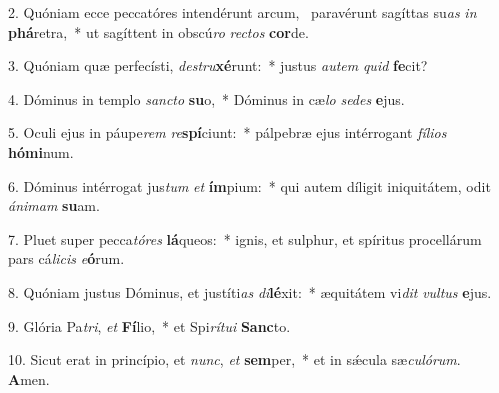 2. Quóniam ecce peccatóres intendérunt arcum, \dag\  paravérunt sagíttas su\textit{as} \textit{in} \textbf{phá}retra,~*  ut sagíttent in obscú\textit{ro} \textit{rec}\textit{tos} \textbf{cor}de.\

3. Quóniam quæ perfecísti, \textit{de}\textit{stru}\textbf{xé}runt:~*  justus \textit{au}\textit{tem} \textit{quid} \textbf{fe}cit?\

4. Dóminus in templo \textit{sanc}\textit{to} \textbf{su}o,~*  Dóminus in cæ\textit{lo} \textit{se}\textit{des} \textbf{e}jus.\

5. Oculi ejus in páupe\textit{rem} \textit{re}\textbf{spí}ciunt:~*  pálpebræ ejus intérrogant \textit{fí}\textit{li}\textit{os} \textbf{hó}\textbf{mi}num.\

6. Dóminus intérrogat jus\textit{tum} \textit{et} \textbf{ím}pium:~*  qui autem díligit iniquitátem, odit \textit{á}\textit{ni}\textit{mam} \textbf{su}am.\

7. Pluet super pecca\textit{tó}\textit{res} \textbf{lá}queos:~*  ignis, et sulphur, et spíritus procellárum pars cá\textit{li}\textit{cis} \textit{e}\textbf{ó}rum.\

8. Quóniam justus Dóminus, et justíti\textit{as} \textit{di}\textbf{lé}xit:~*  æquitátem vi\textit{dit} \textit{vul}\textit{tus} \textbf{e}jus.\

9. Glória Pa\textit{tri}, \textit{et} \textbf{Fí}lio,~*  et Spi\textit{rí}\textit{tu}\textit{i} \textbf{Sanc}to.\

10. Sicut erat in princípio, et \textit{nunc}, \textit{et} \textbf{sem}per,~*  et in sǽcula sæ\textit{cu}\textit{ló}\textit{rum}. \textbf{A}men.\


